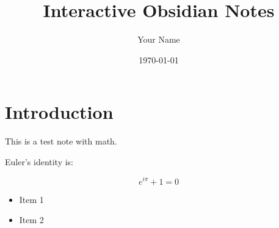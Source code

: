 \documentclass{article}
\title{Interactive Obsidian Notes}
\author{Your Name}
\date{\today}
\begin{document}
\maketitle

\section{Introduction}

This is a test note with math.

Euler's identity is:

\[
e^{i\pi} + 1 = 0
\]

\begin{itemize}
  \item Item 1
  \item Item 2
\end{itemize}
\end{document}

